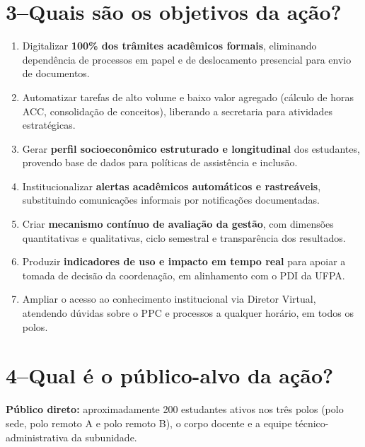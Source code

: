 \documentclass[12pt,a4paper]{article}
\begin{document}
\section{3\;–\;Quais são os objetivos da ação?}

\begin{enumerate}[label={\textbf{\arabic*.}}, leftmargin=*, itemsep=3pt]
  \item Digitalizar \textbf{100\% dos trâmites acadêmicos formais}, eliminando dependência
    de processos em papel e de deslocamento presencial para envio de documentos.
  \item Automatizar tarefas de alto volume e baixo valor agregado (cálculo de horas ACC,
    consolidação de conceitos), liberando a secretaria para atividades estratégicas.
  \item Gerar \textbf{perfil socioeconômico estruturado e longitudinal} dos estudantes,
    provendo base de dados para políticas de assistência e inclusão.
  \item Institucionalizar \textbf{alertas acadêmicos automáticos e rastreáveis},
    substituindo comunicações informais por notificações documentadas.
  \item Criar \textbf{mecanismo contínuo de avaliação da gestão}, com dimensões
    quantitativas e qualitativas, ciclo semestral e transparência dos resultados.
  \item Produzir \textbf{indicadores de uso e impacto em tempo real} para apoiar a
    tomada de decisão da coordenação, em alinhamento com o PDI da UFPA.
  \item Ampliar o acesso ao conhecimento institucional via Diretor Virtual, atendendo
    dúvidas sobre o PPC e processos a qualquer horário, em todos os polos.
\end{enumerate}

\section{4\;–\;Qual é o público-alvo da ação?}

\noindent\textbf{Público direto:} aproximadamente 200 estudantes ativos nos três polos
(polo sede, polo remoto A e polo remoto B), o corpo docente e a equipe técnico-administrativa
da subunidade.
\end{document}
